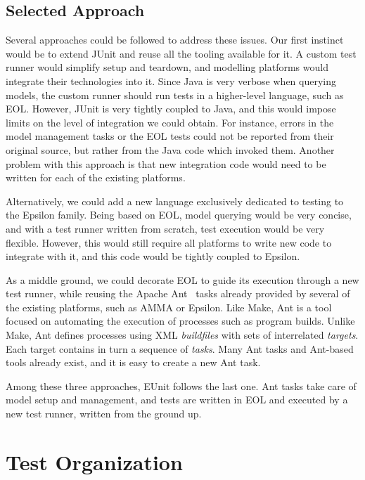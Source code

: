 \subsection{Selected Approach}
\label{sec:eunit-selected-approach}

Several approaches could be followed to address these issues. Our first instinct would be to extend JUnit and reuse all the tooling available for it. A custom test runner would simplify setup and teardown, and modelling platforms would integrate their technologies into it. Since Java is very verbose when querying models, the custom runner should run tests in a higher-level language, such as EOL. However, JUnit is very tightly coupled to Java, and this would impose limits on the level of integration we could obtain. For instance, errors in the model management tasks or the EOL tests could not be reported from their original source, but rather from the Java code which invoked them.  Another problem with this approach is that new integration code would need to be written for each of the existing platforms.

Alternatively, we could add a new language exclusively dedicated to testing to the Epsilon family.  Being based on EOL, model querying would be very concise, and with a test runner written from scratch, test execution would be very flexible. However, this would still require all platforms to write new code to integrate with it, and this code would be tightly coupled to Epsilon.

As a middle ground, we could decorate EOL to guide its execution through a new test runner, while reusing the Apache Ant~\cite{ANT} tasks already provided by several of the existing platforms, such as AMMA or Epsilon. Like Make, Ant is a tool focused on automating the execution of processes such as program builds. Unlike Make, Ant defines processes using XML \emph{buildfiles} with sets of interrelated \emph{targets}. Each target contains in turn a sequence of \emph{tasks}. Many Ant tasks and Ant-based tools already exist, and it is easy to create a new Ant task.

Among these three approaches, EUnit follows the last one. Ant tasks take care of model setup and management, and tests are written in EOL and executed by a new test runner, written from the ground up.

\section{Test Organization}
\label{sec:eunit-test-organization}

